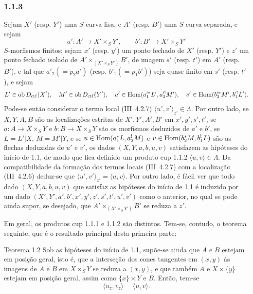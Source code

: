\subsubsection*{1.1.3}
Sejam $X'$ (resp. $Y'$) uma $S$-curva lisa, e $A'$ (resp. $B'$) uma $S$-curva separada, e sejam
\[
a':A'\longrightarrow X'\times_S Y',
\qquad
b':B'\longrightarrow X'\times_S Y'
\]
$S$-morfismos finitos; sejam $x'$ (resp. $y'$) um ponto fechado de $X'$ (resp. $Y'$) e $z'$ um ponto fechado isolado de $A'\times_{(X'\times_S Y')}B'$, de imagem $s'$ (resp. $t'$) em $A'$ (resp. $B'$), e tal que $a'_2(=p_2a')$ (resp. $b'_1(=p_1b')$) seja quase finito em $s'$ (resp. $t'$), e sejam
\[
L'\in\operatorname{ob} D_{\mathrm{ctf}}(X'),\quad M'\in\operatorname{ob} D_{\mathrm{ctf}}(Y'),\quad
u'\in\operatorname{Hom}(a_1'^*L',a_2'^!M'),\quad v'\in\operatorname{Hom}(b_2'^*M',b_1'^!L').
\]
Pode-se então considerar o termo local (III~4.2.7) $\langle u',v'\rangle_{z'}\in\Lambda$. Por outro lado, se $X,Y,A,B$ são as localizações estritas de $X',Y',A',B'$ em $x',y',s',t'$, se $a:A\to X\times_S Y$ e $b:B\to X\times_SY$ são os morfismos deduzidos de $a'$ e $b'$, se $L=L'|X$, $M=M'|Y$, e se $u\in\operatorname{Hom}(a_1^*L,a_2^!M)$ e $v\in\operatorname{Hom}(b_2^*M,b_1^!L)$ são as flechas deduzidas de $u'$ e $v'$, os dados $(X,Y,a,b,u,v)$ satisfazem as hipóteses do início de 1.1, de modo que fica definido um produto cup 1.1.2 $\langle u,v\rangle\in\Lambda$. Da compatibilidade da formação dos termos locais (III~4.2.7) com a localização (III~4.2.6) deduz-se que $\langle u',v'\rangle_{z'}=\langle u,v\rangle$. Por outro lado, é fácil ver que todo dado $(X,Y,a,b,u,v)$ que satisfaz as hipóteses do início de 1.1 é induzido por um dado $(X',Y',a',b',x',y',z',s',t',u',v')$ como o anterior, no qual se pode ainda supor, se desejado, que $A'\times_{(X'\times_S Y')}B'$ se reduza a $z'$.

Em geral, os produtos cup 1.1.1 e 1.1.2 são distintos. Tem-se, contudo, o teorema seguinte, que é o resultado principal desta primeira parte:

\begin{statement}{Teorema 1.2}
Sob as hipóteses do início de 1.1, supõe-se ainda que $A$ e $B$ estejam em posição geral, isto é, que a interseção dos cones tangentes em $(x,y)$ às imagens de $A$ e $B$ em $X\times_S Y$ se reduza a $(x,y)$, e que também $A$ e $X\times\{y\}$ estejam em posição geral, assim como $\{x\}\times Y$ e $B$. Então, tem-se
\begin{equation}\tag{1.2.1}
\langle u_z,v_z\rangle=\langle u,v\rangle.
\end{equation}
\end{statement}

